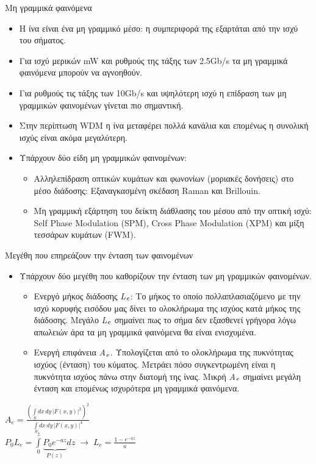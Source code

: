 \documentclass[11pt,aspectratio=169]{beamer}
\begin{document}
\begin{frame}[shrink=20,t]{Μη γραμμικά φαινόμενα}
\begin{itemize}
\item Η ίνα είναι ένα μη γραμμικό μέσο: η συμπεριφορά της εξαρτάται από την ισχύ του σήματος.
\item Για ισχύ μερικών mW και ρυθμούς της τάξης των 2.5Gb/s τα μη γραμμικά φαινόμενα μπορούν να αγνοηθούν.
\item Για ρυθμούς τις τάξης των 10Gb/s και υψηλότερη ισχύ η επίδραση των μη γραμμικών φαινομένων γίνεται πιο σημαντική.
\item Στην περίπτωση WDM η ίνα μεταφέρει πολλά κανάλια και επομένως η συνολική ισχύς είναι ακόμα μεγαλύτερη.
\item Υπάρχουν δύο είδη μη γραμμικών φαινομένων:
\begin{itemize}
\item Αλληλεπίδραση οπτικών κυμάτων και φωνονίων (μοριακές δονήσεις) στο μέσο διάδοσης: Εξαναγκασμένη σκέδαση Raman και Brillouin.
\item Μη γραμμική εξάρτηση του δείκτη διάθλασης του μέσου από την οπτική ισχύ: Self Phase Modulation (SPM), Cross Phase Modulation (XPM) και μίξη τεσσάρων κυμάτων (FWM).
\end{itemize}
\end{itemize}
\end{frame}

\begin{frame}[shrink=20,t]{Μεγέθη που επηρεάζουν την ένταση των φαινομένων}
\begin{itemize}
\item Υπάρχουν δύο μεγέθη που καθορίζουν την ένταση των μη γραμμικών φαινομένων.
\begin{itemize}
\item Ενεργό μήκος διάδοσης \textit{L}$_{\text{\textit{e}}}$: Το μήκος το οποίο πολλαπλασιαζόμενο με την ισχύ κορυφής εισόδου μας δίνει το ολοκλήρωμα της ισχύος κατά μήκος της διάδοσης. Μεγάλο \textit{L}$_{\text{\textit{e}}}$ σημαίνει πως το σήμα δεν εξασθενεί γρήγορα λόγω απωλειών άρα τα μη γραμμικά φαινόμενα θα είναι ενισχυμένα.
\item Ενεργή επιφάνεια \textit{Α}$_{\text{\textit{e}}}$. Υπολογίζεται από το ολοκλήρωμα της πυκνότητας ισχύος (ένταση) του κύματος. Μετράει πόσο συγκεντρωμένη είναι η πυκνότητα ισχύος πάνω στην διατομή της ίνας. Μικρή \textit{A}$_{\text{\textit{e}}}$ σημαίνει μεγάλη ένταση και επομένως ισχυρότερα μη γραμμικά φαινόμενα.
\end{itemize}
\end{itemize}
\begin{center}
$\displaystyle A_{e}=\frac{\left(\int\limits_{S}dx\,dy\,|F(x,y)|^{2}\right)^{2}}{\int\limits_{S}dx\,dy\,|F(x,y)|^{4}}$\\[0.6ex]
$\displaystyle P_{0}L_{e}=\int\limits_{0}^{z}\underbrace{P_{0}e^{-az}}_{P(z)}dz\;\rightarrow\;L_{e}=\frac{1-e^{-az}}{a}$\\[0.6ex]
\end{center}
\end{frame}
\end{document}
